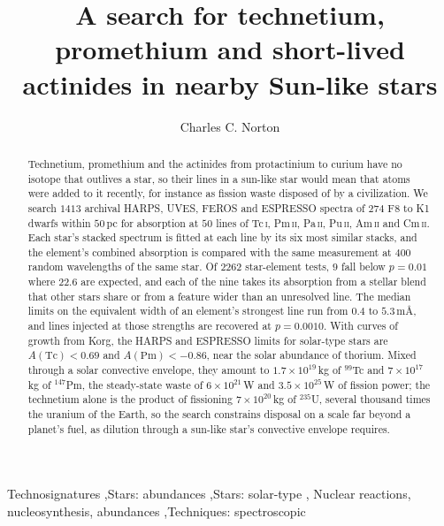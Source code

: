 \documentclass[3p,11pt]{elsarticle}
\newcommand{\sci}[2]{#1\times10^{#2}}
\newcommand{\ion}[2]{#1\,\textsc{#2}}
\newcommand{\nuc}[2]{$^{#1}$#2}
\begin{document}
\begin{frontmatter}

\title{A search for technetium, promethium and short-lived actinides in nearby Sun-like stars}

\author{Charles C. Norton}

\begin{abstract}
Technetium, promethium and the actinides from protactinium to curium have no isotope
that outlives a star, so their lines in a sun-like star would mean that atoms were added
to it recently, for instance as fission waste disposed of by a civilization. We search
$1413$ archival HARPS, UVES, FEROS and ESPRESSO spectra of $274$ F8 to K1 dwarfs within
$50$\,pc for absorption at $50$ lines of \ion{Tc}{i}, \ion{Pm}{ii}, \ion{Pa}{ii},
\ion{Pu}{ii}, \ion{Am}{ii} and \ion{Cm}{ii}. Each star's stacked spectrum is fitted at
each line by its six most similar stacks, and the element's combined absorption is
compared with the same measurement at $400$ random wavelengths of the same star. Of
$2262$ star-element tests, $9$ fall below $p=0.01$ where $22.6$ are expected, and each
of the nine takes its absorption from a stellar blend that other stars share or from a
feature wider than an unresolved line. The median limits on the equivalent width of an
element's strongest line run from $0.4$ to $5.3$\,m\AA, and lines injected at those
strengths are recovered at $p=0.0010$. With curves of growth from Korg, the HARPS and
ESPRESSO limits for solar-type stars are $A(\mathrm{Tc})<0.69$ and
$A(\mathrm{Pm})<-0.86$, near the solar abundance of thorium. Mixed through a solar
convective envelope, they amount to $\sci{1.7}{19}$\,kg of \nuc{99}{Tc} and
$\sci{7}{17}$\,kg of \nuc{147}{Pm}, the steady-state waste of $\sci{6}{21}$\,W and
$\sci{3.5}{25}$\,W of fission power; the technetium alone is the product of fissioning
$\sci{7}{20}$\,kg of \nuc{235}{U}, several thousand times the uranium of the Earth, so the
search constrains disposal on a scale far beyond a planet's fuel, as dilution through a
sun-like star's convective envelope requires.
\end{abstract}

\begin{keyword}
Technosignatures \sep Stars: abundances \sep Stars: solar-type \sep
Nuclear reactions, nucleosynthesis, abundances \sep Techniques: spectroscopic
\end{keyword}

\end{frontmatter}

\end{document}
